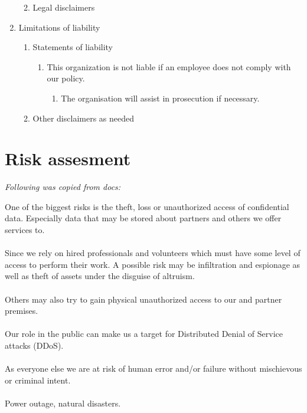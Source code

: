 \begin{enumerate}
\begin{enumerate}
\begin{enumerate}
    \end{enumerate}
    \item Legal disclaimers
  \end{enumerate}
  \item Limitations of liability
  \begin{enumerate}
    \item Statements of liability
    \begin{enumerate}
      \item This organization is not liable if an employee does not comply with our policy.
      \begin{enumerate}
        \item The organisation will assist in prosecution if necessary.
      \end{enumerate}
    \end{enumerate}
    \item Other disclaimers as needed
  \end{enumerate}
\end{enumerate}


\section{Risk assesment}

\textit{Following was copied from docs:}

One of the biggest risks is the theft, loss or unauthorized access of confidential data. Especially data that may be stored about partners and others we offer services to.
\\
\\
Since we rely on hired professionals and volunteers which must have some level of access to perform their work. A possible risk may be infiltration and espionage as well as theft of assets under the disguise of altruism.
\\
\\
Others may also try to gain physical unauthorized access to our and partner premises.
\\
\\
Our role in the public can make us a target for Distributed Denial of Service attacks (DDoS).
\\
\\
As everyone else we are at risk of human error and/or failure without mischievous or criminal intent. 
\\
\\
Power outage, natural disasters.

